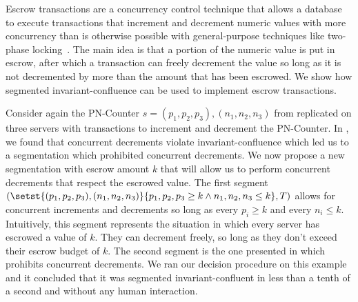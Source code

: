 Escrow transactions are a concurrency control technique that allows a database
to execute transactions that increment and decrement numeric values with more
concurrency than is otherwise possible with general-purpose techniques like
two-phase locking~\cite{o1986escrow}. The main idea is that a portion of the
numeric value is put in escrow, after which a transaction can freely decrement
the value so long as it is not decremented by more than the amount that has
been escrowed. We show how segmented invariant-confluence can be used to
implement escrow transactions.

Consider again the PN-Counter $s = (p_1, p_2, p_3), (n_1, n_2, n_3)$ from
 replicated on three servers with transactions
to increment and decrement the PN-Counter. In
, we found that concurrent decrements violate
invariant-confluence which led us to a segmentation which prohibited concurrent
decrements. We now propose a new segmentation with escrow amount $k$ that will
allow us to perform concurrent decrements that respect the escrowed value. The
first segment $(\setst{(p_1, p_2, p_3), (n_1, n_2, n_3)}{p_1, p_2, p_3 \geq k
\land n_1, n_2, n_3 \leq k}, T)$ allows for concurrent increments and
decrements so long as every $p_i \geq k$ and every $n_i \leq k$. Intuitively,
this segment represents the situation in which every server has escrowed a
value of $k$. They can decrement freely, so long as they don't exceed their
escrow budget of $k$. The second segment is the one presented in
 which prohibits concurrent decrements. We ran
our decision procedure on this example and it concluded that it was segmented
invariant-confluent in less than a tenth of a second and without any human
interaction.

